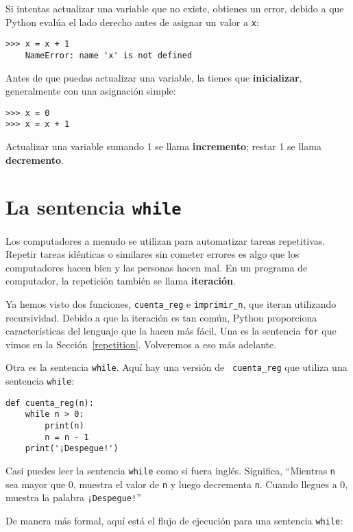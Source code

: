 \documentclass[10pt]{book}
\begin{document}
Si intentas actualizar una variable que no existe, obtienes un
error, debido a que Python evalúa el lado derecho antes de asignar
un valor a {\tt x}:

\begin{verbatim}
>>> x = x + 1
    NameError: name 'x' is not defined
\end{verbatim}
%
Antes de que puedas actualizar una variable, la tienes que {\bf inicializar},
generalmente con una asignación simple:

\begin{verbatim}
>>> x = 0
>>> x = x + 1
\end{verbatim}
%
Actualizar una variable sumando 1 se llama {\bf incremento};
restar 1 se llama {\bf decremento}.




\section{La sentencia {\tt while}}

Los computadores a menudo se utilizan para automatizar tareas repetitivas.  Repetir
tareas idénticas o similares sin cometer errores es algo que
los computadores hacen bien y las personas hacen mal.  En un programa de computador,
la repetición también se llama {\bf iteración}.

Ya hemos visto dos funciones, {\tt cuenta\_reg} e
\verb"imprimir_n", que iteran utilizando recursividad.  Debido a que la iteración es tan
común, Python proporciona características del lenguaje que la hacen más fácil.
Una es la sentencia {\tt for} que vimos en la Sección~\ref{repetition}.
Volveremos a eso más adelante.

Otra es la sentencia {\tt while}.  Aquí hay una versión de {\tt
cuenta\_reg} que utiliza una sentencia {\tt while}:

\begin{verbatim}
def cuenta_reg(n):
    while n > 0:
        print(n)
        n = n - 1
    print('¡Despegue!')
\end{verbatim}
%
Casi puedes leer la sentencia {\tt while} como si fuera inglés.
Significa, ``Mientras {\tt n} sea mayor que 0,
muestra el valor de {\tt n} y luego decrementa
{\tt n}.  Cuando llegues a 0, muestra la palabra {\tt ¡Despegue!}''

De manera más formal, aquí está el flujo de ejecución para una sentencia {\tt while}:
\end{document}
